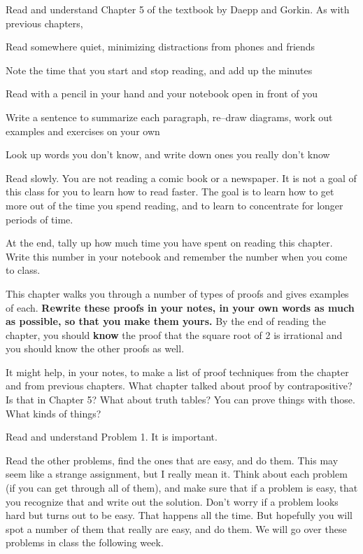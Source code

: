 
\noindent
Read and understand Chapter 5 of the textbook by Daepp and Gorkin.
As with previous chapters,
{\small
\blist{0.0in}
\item Read somewhere quiet, minimizing distractions from phones and friends
\item Note the time that you start and stop reading, and add up the minutes
\item Read with a pencil in your hand and your notebook open in front of you
\item Write a sentence to summarize each paragraph, re--draw diagrams, work out examples and exercises on your own
\item Look up words you don't know, and write down ones you really don't know
\item Read slowly.  You are not reading a comic book or a newspaper.  It is not a goal of this class for you to learn how to read faster.  The goal is to learn how to get more out of the time you spend reading, and to learn to concentrate for longer periods of time.
\item At the end, tally up how much time you have spent on reading this chapter.
Write this number in your notebook and remember the number when you come to class.
\elist
}

This chapter walks you through a number of types of proofs and gives examples of each.  {\bf Rewrite these proofs in your notes, in your own words as much as possible, so that you make them yours.}  By the end of reading the chapter, you should {\bf know} the proof that the square root of 2 is irrational and you should know the other proofs as well.

It might help, in your notes, to make a list of proof techniques from the chapter and from previous chapters.
What chapter talked about proof by contrapositive?  Is that in Chapter 5?
What about truth tables?  You can prove things with those.  What kinds of things?

Read and understand Problem 1.  It is important.

Read the other problems, find the ones that are easy, and do them.
This may seem like a strange assignment, but I really mean it.  Think about each problem (if you can get through all of them), and make sure that if a problem is easy, that you recognize that and write out the solution.
Don't worry if a problem looks hard but turns out to be easy.
That happens all the time.
But hopefully you will spot a number of them that really are easy, and do them.
We will go over these problems in class the following week.

\vfill          %
